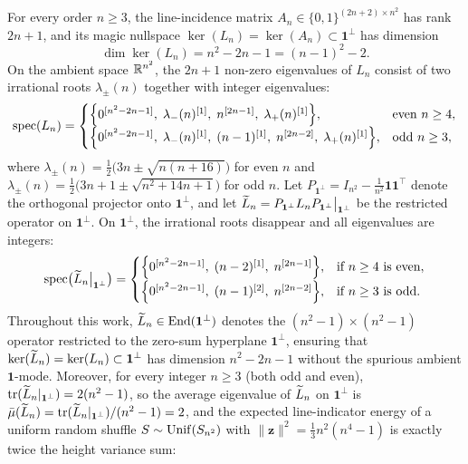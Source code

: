 \begin{proposition}
\label{prop:spectral_rationalization}
For every order $n \ge 3$, the line-incidence matrix $A_n \in \{0,1\}^{(2n+2)\times n^2}$ has rank $2n+1$, and its magic nullspace $\ker(L_n) = \ker(A_n) \subset \mathbf{1}^\perp$ has dimension
\begin{equation}
  \dim \ker(L_n) = n^2 - 2n - 1 = (n-1)^2 - 2.
  \label{eq:magic_nullity}
\end{equation}
On the ambient space $\mathbb{R}^{n^2}$, the $2n+1$ non-zero eigenvalues of $L_n$ consist of two irrational roots $\lambda_\pm(n)$ together with integer eigenvalues:
\begin{equation}
  \operatorname{spec}(L_n) = \begin{cases}
    \Bigl\{0^{[n^2-2n-1]},\; \lambda_-(n)^{[1]},\; n^{[2n-1]},\; \lambda_+(n)^{[1]}\Bigr\}, & \text{even } n \ge 4,\\
    \Bigl\{0^{[n^2-2n-1]},\; \lambda_-(n)^{[1]},\; (n-1)^{[1]},\; n^{[2n-2]},\; \lambda_+(n)^{[1]}\Bigr\}, & \text{odd } n \ge 3,
  \end{cases}
  \label{eq:unprojected_spectrum}
\end{equation}
where $\lambda_\pm(n) = \frac{1}{2}\bigl(3n \pm \sqrt{n(n+16)}\bigr)$ for even $n$ and $\lambda_\pm(n) = \frac{1}{2}\bigl(3n+1 \pm \sqrt{n^2+14n+1}\bigr)$ for odd $n$. Let $P_{\mathbf{1}^\perp} = I_{n^2} - \frac{1}{n^2}\mathbf{1}\mathbf{1}^\top$ denote the orthogonal projector onto $\mathbf{1}^\perp$, and let $\widetilde{L}_n = P_{\mathbf{1}^\perp} L_n P_{\mathbf{1}^\perp}\big|_{\mathbf{1}^\perp}$ be the restricted operator on $\mathbf{1}^\perp$. On $\mathbf{1}^\perp$, the irrational roots disappear and all eigenvalues are integers:
\begin{equation}
  \operatorname{spec}\bigl(\widetilde{L}_n\big|_{\mathbf{1}^\perp}\bigr) = \begin{cases}
    \Bigl\{0^{[n^2-2n-1]},\; (n-2)^{[1]},\; n^{[2n-1]}\Bigr\}, & \text{if } n \ge 4 \text{ is even}, \\[0.8ex]
    \Bigl\{0^{[n^2-2n-1]},\; (n-1)^{[2]},\; n^{[2n-2]}\Bigr\}, & \text{if } n \ge 3 \text{ is odd}.
  \end{cases}
  \label{eq:rationalized_spectrum}
\end{equation}
Throughout this work, $\widetilde{L}_n \in \operatorname{End}(\mathbf{1}^\perp)$ denotes the $(n^2-1)\times(n^2-1)$ operator restricted to the zero-sum hyperplane $\mathbf{1}^\perp$, ensuring that $\ker(\widetilde{L}_n) = \ker(L_n) \subset \mathbf{1}^\perp$ has dimension $n^2 - 2n - 1$ without the spurious ambient $\mathbf{1}$-mode. Moreover, for every integer $n \ge 3$ (both odd and even), $\operatorname{tr}(\widetilde{L}_n|_{\mathbf{1}^\perp}) = 2(n^2 - 1)$, so the average eigenvalue of $\widetilde{L}_n$ on $\mathbf{1}^\perp$ is $\bar{\mu}(\widetilde{L}_n) = \operatorname{tr}(\widetilde{L}_n|_{\mathbf{1}^\perp})/(n^2-1) = 2$, and the expected line-indicator energy of a uniform random shuffle $S \sim \operatorname{Unif}(S_{n^2})$ with $\|\mathbf{z}\|^2 = \frac{1}{3}n^2(n^4-1)$ is exactly twice the height variance sum:

\end{proposition}
